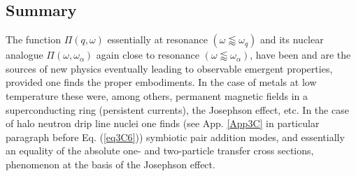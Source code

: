 \subsection{Summary}
The function $\Pi(q,\omega)$ essentially at resonance $(\omega\lessapprox\omega_q)$ and its nuclear analogue  $\Pi(\omega,\omega_\alpha)$ again close to resonance $(\omega\lessapprox\omega_\alpha)$, have been and are the sources of new physics eventually leading to observable emergent properties, provided one finds the  proper embodiments. In the case of metals at low temperature these were, among others, permanent magnetic fields in a superconducting ring (persistent currents), the Josephson effect, etc. In the case of halo neutron drip line nuclei one finds (see App. \ref{App3C} in particular paragraph before Eq. (\ref{eq3C6})) symbiotic pair addition modes,  and  essentially an equality of the absolute one- and two-particle transfer cross sections, phenomenon at the basis of the Josephson effect. 




